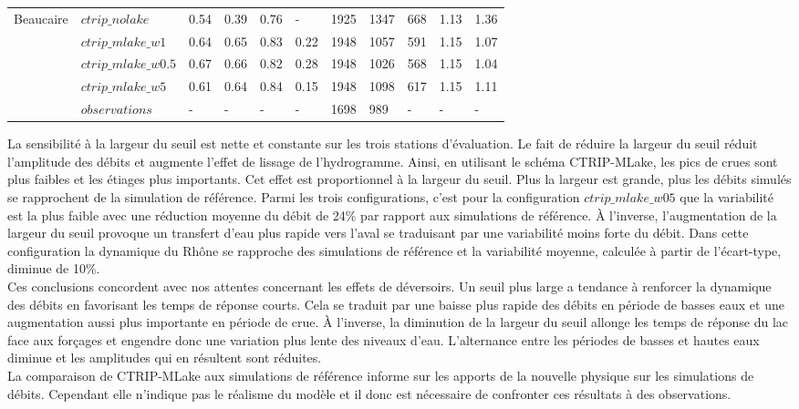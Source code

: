 \begin{table}[h!]
\begin{tabularx}{\textwidth}{p{1.3cm}p{2.7cm}p{0.9cm}p{0.9cm}p{0.9cm}p{0.7cm}p{0.8cm}p{0.8cm}p{0.8cm}p{0.7cm}p{0.7cm}}
		\hline
                \multirow{4}{4cm}{Beaucaire}&\footnotesize{$ctrip\_nolake$}&0.54&0.39&0.76&-&1925&1347&668&1.13&1.36\\
		&\footnotesize{$ctrip\_mlake\_w1$}&0.64&0.65&0.83&0.22&1948&1057&591&1.15&1.07\\
		&\footnotesize{$ctrip\_mlake\_w0.5$}&0.67&0.66&0.82&0.28&1948&1026&568&1.15&1.04\\
		&\footnotesize{$ctrip\_mlake\_w5$}&0.61&0.64&0.84&0.15&1948&1098&617&1.15&1.11\\
		&\footnotesize{$observations$}&-&-&-&-&1698&989&-&-&-\\
		\hline
	\end{tabularx}
\end{table}

La sensibilité à la largeur du seuil est nette et constante sur les trois stations d'évaluation. Le fait de réduire la largeur du seuil réduit l'amplitude des débits et augmente l'effet de lissage de l'hydrogramme. Ainsi, en utilisant le schéma CTRIP-MLake, les pics de crues sont plus faibles et les étiages plus importants. Cet effet est proportionnel à la largeur du seuil. Plus la largeur est grande, plus les débits simulés se rapprochent de la simulation de référence. Parmi les trois configurations, c'est pour la configuration $ctrip\_mlake\_w05$ que la variabilité est la plus faible avec une réduction moyenne du débit de 24\% par rapport aux simulations de référence. À l'inverse, l'augmentation de la largeur du seuil provoque un transfert d'eau plus rapide vers l'aval se traduisant par une variabilité moins forte du débit. Dans cette configuration la dynamique du Rhône se rapproche des simulations de référence et la variabilité moyenne, calculée à partir de l'écart-type, diminue de 10\%. \\

\noindent Ces conclusions concordent avec nos attentes concernant les effets de déversoirs. Un seuil plus large a tendance à renforcer la dynamique des débits en favorisant les temps de réponse courts. Cela se traduit par une baisse plus rapide des débits en période de basses eaux et une augmentation aussi plus importante en période de crue. À l'inverse, la diminution de la largeur du seuil allonge les temps de réponse du lac face aux forçages et engendre donc une variation plus lente des niveaux d'eau. L'alternance entre les périodes de basses et hautes eaux diminue et les amplitudes qui en résultent sont réduites.\\

\noindent La comparaison de CTRIP-MLake aux simulations de référence informe sur les apports de la nouvelle physique sur les simulations de débits. Cependant elle n'indique pas le réalisme du modèle et il donc est nécessaire de confronter ces résultats à des observations.


